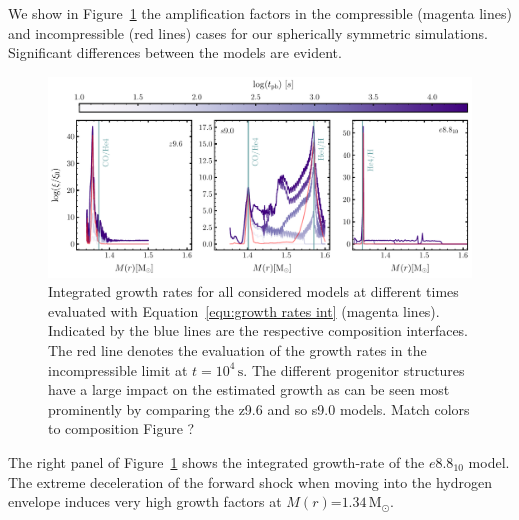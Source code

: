 \documentclass[fleqn,usenatbib]{mnras}
\newcommand{\COM}[1]{{\color{orange}#1}}
\begin{document}
We show in Figure~\ref{fig:growth rates} the amplification factors in the compressible (magenta lines) and incompressible (red lines) cases for our spherically symmetric simulations. Significant differences between the models are evident.
\begin{figure}
 \centering
 \includegraphics[width=\textwidth]{pic/growth_rates_1d.pdf}
 \caption{Integrated growth rates for all considered models at different times evaluated with Equation~\ref{equ:growth rates int} (magenta lines). Indicated by the blue lines are the respective composition interfaces. The red line denotes the evaluation of the growth rates in the incompressible limit at $t=10^{4}\,\text{s}$. The different progenitor structures have a large impact on the estimated growth as can be seen most prominently by comparing the z9.6 and so s9.0 models. \COM{Match colors to composition Figure ?} }
 \label{fig:growth rates}
\end{figure}

The right panel of Figure~\ref{fig:growth rates} shows the integrated growth-rate of the $e8.8_{10}$ model.
The extreme deceleration of the forward shock when moving into the hydrogen envelope induces very high growth factors at $M(r)\mathord{=}1.34\,\mathrm{M_{\odot}}$.
\end{document}
